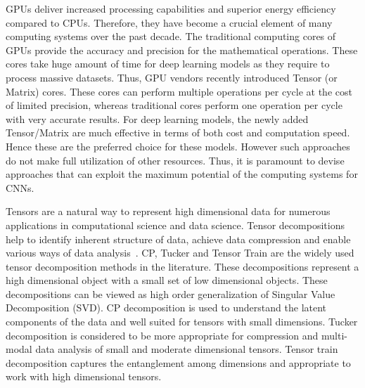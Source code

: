 GPUs deliver increased processing capabilities and superior energy efficiency compared to CPUs. Therefore, they have become a crucial element of many computing systems over the past decade. The traditional computing cores of GPUs provide the accuracy and precision for the mathematical operations. These cores take huge amount of time for deep learning models as they require to process massive datasets. Thus, GPU vendors recently introduced Tensor (or Matrix) cores. These cores can perform multiple operations per cycle at the cost of limited precision, whereas traditional cores perform one operation per cycle with very accurate results. For deep learning models, the newly added Tensor/Matrix are much effective in terms of both cost and computation speed. Hence these are the preferred choice for these models. However such approaches do not make full utilization of other resources. Thus, it is paramount to devise approaches that can exploit the maximum potential of the computing systems for CNNs.



Tensors are a natural way to represent high dimensional data for numerous applications in computational science and data science. Tensor decompositions help to identify inherent structure of data, achieve data compression and enable various ways of data analysis~\cite{KB-SIAMReview2009}. CP, Tucker and Tensor Train are the widely used tensor decomposition methods in the literature. These decompositions represent a high dimensional object with a small set of low dimensional objects. These decompositions can be viewed as high order generalization of Singular Value Decomposition (SVD). CP decomposition is used to understand the latent components of the data and well suited for tensors with small dimensions. Tucker decomposition is considered to be more appropriate for compression and multi-modal data analysis of small and moderate dimensional tensors. Tensor train decomposition captures the entanglement among dimensions and appropriate to work with high dimensional tensors.


